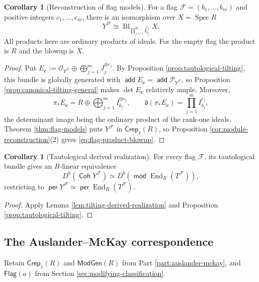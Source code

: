 \documentclass[a4paper,reqno]{amsart}
\def\F{\mathcal{F}}
\def\O{\mathcal{O}}
\def\P{\mathcal{P}}
\DeclareMathOperator{\md}{\mathsf{mod}}
\renewcommand{\mod}{\md}
\DeclareMathOperator{\add}{\mathsf{add}}
\DeclareMathOperator{\Coh}{\mathsf{Coh}}
\DeclareMathOperator{\per}{\mathsf{per}}
\DeclareMathOperator{\End}{End}
\DeclareMathOperator{\Spec}{Spec}
\theoremstyle{definition}
\newtheorem{Cor}[Thm]{Corollary}
\begin{document}
\begin{Cor}[Reconstruction of flag models]\label{cor:flag-product-blowup}
For a flag $\F=(b_1,\ldots,b_m)$ and positive integers $c_1,\ldots,c_m$, there is an isomorphism over $X=\Spec R$
\begin{equation}\label{eq:flag-product-blowup}
Y^\F\cong\operatorname{Bl}_{\prod_{j=1}^mI_{b_j}^{c_j}}X.
\end{equation}
All products here are ordinary products of ideals. For the empty flag the product is $R$ and the blowup is $X$.
\end{Cor}
\begin{proof}
Put $E_{\mathbf c}:=\O_{Y^\F}\oplus\bigoplus_{j=1}^mJ_j^{\oplus c_j}$. By Proposition \ref{prop:tautological-tilting}, this bundle is globally generated with $\add E_{\mathbf c}=\add\P_{Y^\F}$, so Proposition \ref{prop:canonical-tilting-general} makes $\det E_{\mathbf c}$ relatively ample. Moreover,
\[
\pi_*E_{\mathbf c}=R\oplus\bigoplus_{j=1}^mI_{b_j}^{\oplus c_j},
\qquad
\mathfrak d(\pi_*E_{\mathbf c})=\prod_{j=1}^mI_{b_j}^{c_j},
\]
the determinant image being the ordinary product of the rank-one ideals. Theorem \ref{thm:flag-models} puts $Y^\F$ in $\mathsf{Crep}_1(R)$, so Proposition \ref{cor:module-reconstruction}(2) gives \eqref{eq:flag-product-blowup}.
\end{proof}

\begin{Cor}[Tautological derived realization]\label{cor:flag-derived-equivalence}
For every flag $\F$, its tautological bundle gives an $R$-linear equivalence
\[
D^b(\Coh Y^\F)\simeq D^b(\mod\End_R(T^\F)),
\]
restricting to $\per Y^\F\simeq\per\End_R(T^\F)$.
\end{Cor}
\begin{proof}
Apply Lemma \ref{lem:tilting-derived-realization} and Proposition \ref{prop:tautological-tilting}.
\end{proof}

\subsection{The Auslander--McKay correspondence}\label{sec:relative-one-model-classification}

Retain $\mathsf{Crep}_1(R)$ and $\mathsf{ModGen}(R)$ from Part \ref{part:auslander-mckay}, and $\mathsf{Flag}(a)$ from Section \ref{sec:modifying-classification}.
\end{document}
